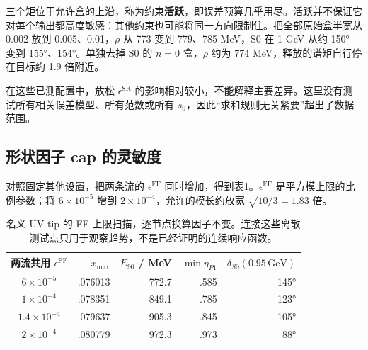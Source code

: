 \documentclass[UTF8,a4paper,11pt,fontset=fandol]{ctexart}
\numberwithin{equation}{section}
\newcommand{\GeV}{\,\mathrm{GeV}}
\newcommand{\eSR}{\epsilon^{\mathrm{SR}}}
\newcommand{\eFF}{\epsilon^{\mathrm{FF}}}
\begin{document}
三个矩位于允许盒的上沿，称为约束\textbf{活跃}，即误差预算几乎用尽。活跃并不保证它对每个输出都高度敏感：其他约束也可能将同一方向限制住。把全部原始盒半宽从 0.002 放到 0.005、0.01，\(\rho\) 从 773 变到 779、785 MeV，S0 在 1 GeV 从约 150° 变到 155°、154°。单独去掉 S0 的 \(n=0\) 盒，\(\rho\) 约为 774 MeV，释放的谱矩自行停在目标约 1.9 倍附近。

在这些已测配置中，放松 \(\eSR\) 的影响相对较小，不能解释主要差异。这里没有测试所有相关误差模型、所有范数或所有 \(s_0\)，因此“求和规则无关紧要”超出了数据范围。

\subsection{形状因子 cap 的灵敏度}
对照固定其他设置，把两条流的 \(\eFF\) 同时增加，得到表\ref{tab:epsff}。\(\eFF\) 是平方模上限的比例参数；将 \(6\times10^{-5}\) 增到 \(2\times10^{-4}\)，允许的模长约放宽 \(\sqrt{10/3}=1.83\) 倍。

\begin{table}[H]\centering\small
\begin{tabular}{crrrr}
\toprule
两流共用 \(\eFF\) & \(x_{\max}\) & \(E_{90}\) / MeV & \(\min\eta_{P1}\) & \(\delta_{S0}(0.95\GeV)\)\\
\midrule
\(6\times10^{-5}\) & .076013 & 772.7 & .585 & 145°\\
\(1\times10^{-4}\) & .078351 & 849.1 & .785 & 123°\\
\(1.4\times10^{-4}\) & .079637 & 905.3 & .845 & 105°\\
\(2\times10^{-4}\) & .080779 & 972.3 & .973 & 88°\\
\bottomrule
\end{tabular}
\caption{名义 UV tip 的 FF 上限扫描，逐节点换算因子不变。连接这些离散测试点只用于观察趋势，不是已经证明的连续响应函数。}\label{tab:epsff}
\end{table}
\end{document}
